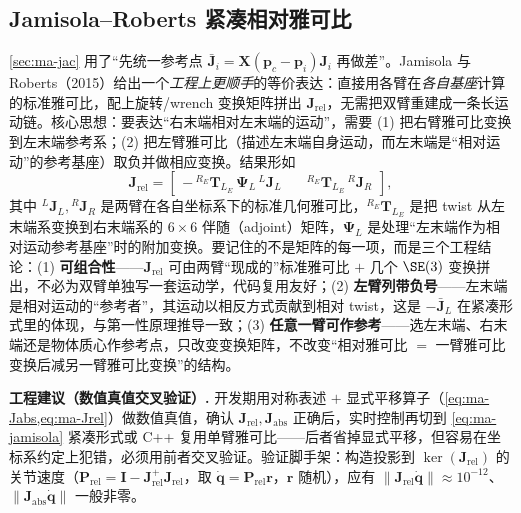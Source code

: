 \subsection{Jamisola--Roberts 紧凑相对雅可比}
\label{sec:ma-compact}

\cref{sec:ma-jac} 用了“先统一参考点 $\bar{\mathbf{J}}_i=\mathbf{X}(\mathbf{p}_c-\mathbf{p}_i)\mathbf{J}_i$ 再做差”。Jamisola 与 Roberts（2015）给出一个\emph{工程上更顺手}的等价表达\cite{jamisola2015compact}：直接用各臂在\emph{各自基座}计算的标准雅可比，配上旋转/wrench 变换矩阵拼出 $\mathbf{J}_{\text{rel}}$，无需把双臂重建成一条长运动链。核心思想：要表达“右末端相对左末端的运动”，需要 (1) 把右臂雅可比变换到左末端参考系；(2) 把左臂雅可比（描述左末端自身运动，而左末端是“相对运动”的参考基座）取负并做相应变换。结果形如
\begin{equation}
  \mathbf{J}_{\text{rel}}=\begin{bmatrix}
  -\,{}^{R_E}\mathbf{T}_{L_E}\,\boldsymbol{\Psi}_L\,{}^{L}\mathbf{J}_L
  & \quad {}^{R_E}\mathbf{T}_{L_E}\,{}^{R}\mathbf{J}_R\end{bmatrix},
  \label{eq:ma-jamisola}
\end{equation}
其中 ${}^{L}\mathbf{J}_L,{}^{R}\mathbf{J}_R$ 是两臂在各自坐标系下的标准几何雅可比，${}^{R_E}\mathbf{T}_{L_E}$ 是把 twist 从左末端系变换到右末端系的 $6\times6$ 伴随（adjoint）矩阵，$\boldsymbol{\Psi}_L$ 是处理“左末端作为相对运动参考基座”时的附加变换。要记住的不是矩阵的每一项，而是三个工程结论：(1) \textbf{可组合性}——$\mathbf{J}_{\text{rel}}$ 可由两臂“现成的”标准雅可比 $+$ 几个 $\SE(3)$ 变换拼出，不必为双臂单独写一套运动学，代码复用友好；(2) \textbf{左臂列带负号}——左末端是相对运动的“参考者”，其运动以相反方式贡献到相对 twist，这是 $-\bar{\mathbf{J}}_L$ 在紧凑形式里的体现，与第一性原理推导一致；(3) \textbf{任意一臂可作参考}——选左末端、右末端还是物体质心作参考点，只改变变换矩阵，不改变“相对雅可比 $=$ 一臂雅可比变换后减另一臂雅可比变换”的结构。

\begin{note}
\textbf{工程建议（数值真值交叉验证）.}\;
开发期用对称表述 $+$ 显式平移算子（\cref{eq:ma-Jabs,eq:ma-Jrel}）做数值真值，确认 $\mathbf{J}_{\text{rel}},\mathbf{J}_{\text{abs}}$ 正确后，实时控制再切到 \cref{eq:ma-jamisola} 紧凑形式或 C++ 复用单臂雅可比——后者省掉显式平移，但容易在坐标系约定上犯错，必须用前者交叉验证。验证脚手架：构造投影到 $\ker(\mathbf{J}_{\text{rel}})$ 的关节速度（$\mathbf{P}_{\text{rel}}=\mathbf{I}-\mathbf{J}_{\text{rel}}^{+}\mathbf{J}_{\text{rel}}$，取 $\dot{\mathbf{q}}=\mathbf{P}_{\text{rel}}\mathbf{r}$，$\mathbf{r}$ 随机），应有 $\|\mathbf{J}_{\text{rel}}\dot{\mathbf{q}}\|\approx10^{-12}$、$\|\mathbf{J}_{\text{abs}}\dot{\mathbf{q}}\|$ 一般非零。
\end{note}

